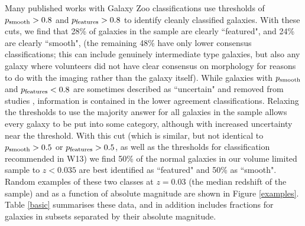 \documentclass[usenatbib]{mn2e}
\begin{document}

 Many published works with Galaxy Zoo classifications use thresholds of $p_{\rm smooth}>0.8$ and $p_{\rm features}>0.8$ to identify cleanly classified galaxies. With these cuts, we find that {28\%} of galaxies in the sample are clearly ``featured", and {24\%} are clearly ``smooth", (the remaining 48\% have only lower consensus classifications; this can include genuinely intermediate type galaxies, but also any galaxy where volunteers did not have clear consensus on morphology for reasons to do with the imaging rather than the galaxy itself). While galaxies with $p_{\rm smooth}$ and $p_{\rm features}<0.8$ are sometimes described as ``uncertain" and removed from studies \citep[e.g.]{Schawinski2014}, information is contained in the lower agreement classifications. Relaxing the thresholds to use the majority answer for all galaxies in the sample allows every galaxy to be put into some category, although with increased uncertainty near the threshold. With this cut (which is similar, but not identical to  $p_{\rm smooth}>0.5$ or $p_{\rm features}>0.5$, as well as the thresholds for classification recommended in W13) we find {50\%} of the normal galaxies in our volume limited sample to $z<0.035$ are best identified as ``featured" and {50\%} as ``smooth". Random examples of these two classes at $z=0.03$ (the median redshift of the sample) and as a function of absolute magnitude are shown in Figure \ref{examples}. %
 Table \ref{basic} summarises these data, and in addition includes fractions for galaxies in subsets separated by their absolute magnitude.
 
\end{document}
